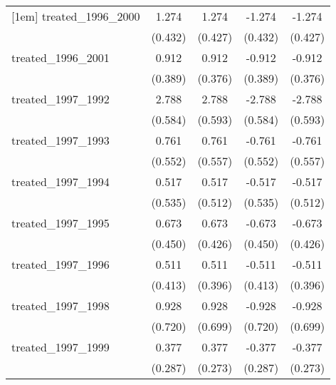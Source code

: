 {\begin{tabular}{l*{4}{c}}
[1em]
treated\_1996\_2000&       1.274\sym{**} &       1.274\sym{**} &      -1.274\sym{**} &      -1.274\sym{**} \\
            &     (0.432)         &     (0.427)         &     (0.432)         &     (0.427)         \\
[1em]
treated\_1996\_2001&       0.912\sym{*}  &       0.912\sym{*}  &      -0.912\sym{*}  &      -0.912\sym{*}  \\
            &     (0.389)         &     (0.376)         &     (0.389)         &     (0.376)         \\
[1em]
treated\_1997\_1992&       2.788\sym{***}&       2.788\sym{***}&      -2.788\sym{***}&      -2.788\sym{***}\\
            &     (0.584)         &     (0.593)         &     (0.584)         &     (0.593)         \\
[1em]
treated\_1997\_1993&       0.761         &       0.761         &      -0.761         &      -0.761         \\
            &     (0.552)         &     (0.557)         &     (0.552)         &     (0.557)         \\
[1em]
treated\_1997\_1994&       0.517         &       0.517         &      -0.517         &      -0.517         \\
            &     (0.535)         &     (0.512)         &     (0.535)         &     (0.512)         \\
[1em]
treated\_1997\_1995&       0.673         &       0.673         &      -0.673         &      -0.673         \\
            &     (0.450)         &     (0.426)         &     (0.450)         &     (0.426)         \\
[1em]
treated\_1997\_1996&       0.511         &       0.511         &      -0.511         &      -0.511         \\
            &     (0.413)         &     (0.396)         &     (0.413)         &     (0.396)         \\
[1em]
treated\_1997\_1998&       0.928         &       0.928         &      -0.928         &      -0.928         \\
            &     (0.720)         &     (0.699)         &     (0.720)         &     (0.699)         \\
[1em]
treated\_1997\_1999&       0.377         &       0.377         &      -0.377         &      -0.377         \\
            &     (0.287)         &     (0.273)         &     (0.287)         &     (0.273)         \\

\end{tabular}}
